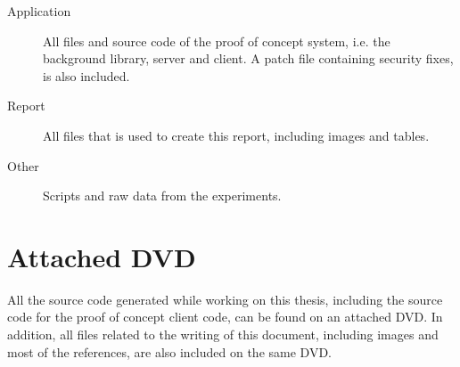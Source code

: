 \documentclass[pdftex,english,10pt,b5paper,twoside]{book}
\begin{document}
\begin{description}
  \item[Application] All files and source code of the proof of concept system,
    i.e. the background library, server and client. A patch file containing
    security fixes, is also included.
  \item[Report] All files that is used to create this report, including images
    and tables.
  \item[Other] Scripts and raw data from the experiments.
\end{description}

\section{Attached DVD}

All the source code generated while working on this thesis, including the
source code for the proof of concept client code, can be found on an attached
DVD. In addition, all files related to the writing of this document, including
images and most of the references, are also included on the same DVD.
\end{document}
